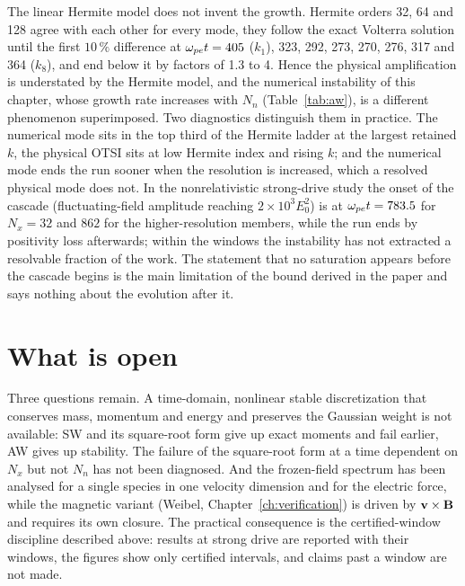 The linear Hermite model does not invent the growth. Hermite orders 32, 64 and 128 agree with each other for every mode, they follow the exact Volterra solution until the first $10\,\%$ difference at $\omega_{pe} t=405$ ($k_1$), 323, 292, 273, 270, 276, 317 and 364 ($k_8$), and end below it by factors of 1.3 to 4. Hence the physical amplification is understated by the Hermite model, and the numerical instability of this chapter, whose growth rate increases with $N_n$ (Table~\ref{tab:aw}), is a different phenomenon superimposed. Two diagnostics distinguish them in practice. The numerical mode sits in the top third of the Hermite ladder at the largest retained $k$, the physical OTSI sits at low Hermite index and rising $k$; and the numerical mode ends the run sooner when the resolution is increased, which a resolved physical mode does not. In the nonrelativistic strong-drive study the onset of the cascade (fluctuating-field amplitude reaching $2\times10^3E_0^2$) is at $\omega_{pe} t=783.5$ for $N_x=32$ and $862$ for the higher-resolution members, while the run ends by positivity loss afterwards; within the windows the instability has not extracted a resolvable fraction of the work. The statement that no saturation appears before the cascade begins is the main limitation of the bound derived in the paper and says nothing about the evolution after it.

\section{What is open}\label{sec:open-limits}

Three questions remain. A time-domain, nonlinear stable discretization that conserves mass, momentum and energy and preserves the Gaussian weight is not available: SW and its square-root form give up exact moments and fail earlier, AW gives up stability. The failure of the square-root form at a time dependent on $N_x$ but not $N_n$ has not been diagnosed. And the frozen-field spectrum has been analysed for a single species in one velocity dimension and for the electric force, while the magnetic variant (Weibel, Chapter~\ref{ch:verification}) is driven by $\mathbf{v}\times\mathbf{B}$ and requires its own closure. The practical consequence is the certified-window discipline described above: results at strong drive are reported with their windows, the figures show only certified intervals, and claims past a window are not made.
